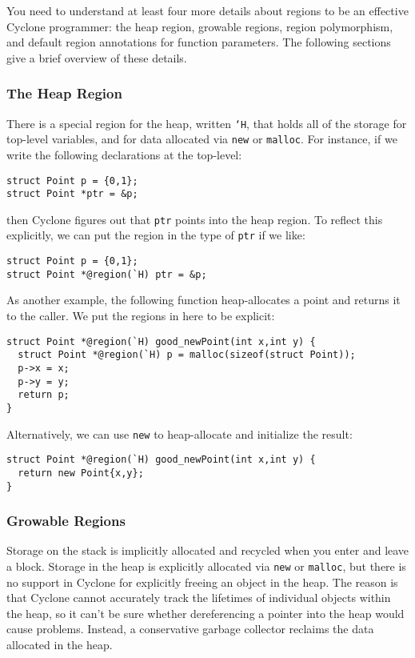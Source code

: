 You need to understand at least four more details about regions to
be an effective Cyclone programmer:  the heap region, growable
regions, region polymorphism, and default region annotations for
function parameters.  The following sections give a brief overview
of these details.

\subsubsection*{The Heap Region}

There is a special region for the heap, written \texttt{`H}, that
holds all of the storage for top-level variables, and for data
allocated via \texttt{new} or \texttt{malloc}.  For instance, if we
write the following declarations at the top-level:
\begin{verbatim}
struct Point p = {0,1};
struct Point *ptr = &p;
\end{verbatim}
then Cyclone figures out that \texttt{ptr} points into the heap
region.  To reflect this explicitly, we can put the region in
the type of \texttt{ptr} if we like:
\begin{verbatim}
struct Point p = {0,1};
struct Point *@region(`H) ptr = &p;
\end{verbatim}

As another example, the following function heap-allocates a point and
returns it to the caller.  We put the regions in here to be explicit:
\begin{verbatim}
struct Point *@region(`H) good_newPoint(int x,int y) {
  struct Point *@region(`H) p = malloc(sizeof(struct Point));
  p->x = x;
  p->y = y;
  return p;
}
\end{verbatim}
Alternatively, we can use \texttt{new} to heap-allocate and 
initialize the result:
\begin{verbatim}
struct Point *@region(`H) good_newPoint(int x,int y) {
  return new Point{x,y};
}
\end{verbatim}

\subsubsection*{Growable Regions}

Storage on the stack is implicitly allocated and recycled when you
enter and leave a block.  Storage in the heap is explicitly allocated
via \texttt{new} or \texttt{malloc}, but there is no support in
Cyclone for explicitly freeing an object in the heap.  The reason is
that Cyclone cannot accurately track the lifetimes of individual
objects within the heap, so it can't be sure whether dereferencing a
pointer into the heap would cause problems.  Instead, a conservative
garbage collector reclaims the data allocated in the heap.

